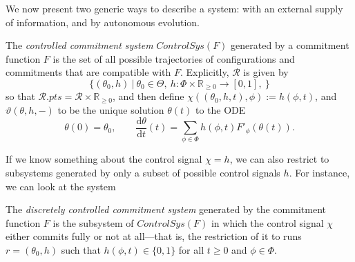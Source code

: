\documentclass{article}
\newcommand\pts[1]{#1.\mathit{pts}}
\newcommand\R{\mathcal R}
\begin{document}
We now present two generic ways to describe a system: with an external supply of information, and by autonomous evolution. 

\begin{defn}
    The \emph{controlled commitment system} 
    $\mathit{ControlSys}(F)$
    generated by a commitment function $F$ is the set  of all possible trajectories of configurations and commitments that are compatible with $F$. 
    Explicitly, $\R$ is given by
    \[
        \Big\{ (\theta_0, h) ~\Big|~  \theta_0 \in \Theta,~
            h : \Phi \times \mathbb R_{\ge 0} \to [0,1],~
             \Big\}
    \]
    so that $\pts \R = \R \times \mathbb R_{\ge 0}$,
    and then define
    $\chi((\theta_0,h,t),\phi) := h(\phi, t)$,
    and 
    $\vartheta(\theta,h,-)$ to be the unique solution $\theta(t)$ to the ODE
    \[
        \theta(0) = \theta_0,
        \qquad \frac{\mathrm d\theta}{\mathrm d t} (t) = 
            \sum_{\phi \in \Phi} h(\phi, t) F'_\phi(\theta(t)).
    \]
\end{defn}

If we know something about the control signal $\chi = h$, we can also restrict to subsystems generated by only a subset of possible 
control signals $h$. For instance, we can look at the system 

\begin{defn}
    The \emph{discretely controlled commitment system} generated by the commitment function $F$ is the subsystem of $\mathit{ControlSys}(F)$ in which the control signal $\chi$ either commits fully or not at all---that is,
    the restriction of it to runs $r = (\theta_0, h)$ such that $h(\phi, t) \in \{0,1\}$
            for all $t \ge 0$ and $\phi \in \Phi$.
\end{defn}


% 
\end{document}
